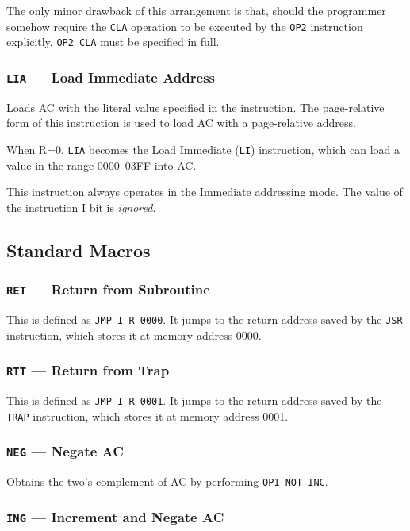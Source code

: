 \documentclass[11pt,a4paper,twocolumns]{article}
\newcommand\hex[1]{\textsf{#1}}
\newcommand\register[1]{\textsf{#1}}
\newcommand\A{\register{AC}}
\begin{document}
The only minor drawback of this arrangement is that, should the
programmer somehow require the {\tt CLA} operation to be executed by
the {\tt OP2} instruction explicitly, {\tt OP2 CLA} must be specified
in full.

\subsubsection{{\tt LIA} — Load Immediate Address}
\label{sec-lia}
\label{sec-li}

Loads \A{} with the literal value specified in the instruction. The
page-relative form of this instruction is used to load \A{} with a
page-relative address.

When R=0, {\tt LIA} becomes the Load Immediate ({\tt LI}) instruction,
which can load a value in the range \hex{0000}–\hex{03FF} into \A.

This instruction always operates in the Immediate addressing mode. The
value of the instruction I bit is {\em ignored}.

\subsection{Standard Macros}
\subsubsection{{\tt RET} — Return from Subroutine}

This is defined as {\tt JMP I R 0000}. It jumps to the return address
saved by the {\tt JSR} instruction, which stores it at memory address
\hex{0000}.

\subsubsection{{\tt RTT} — Return from Trap} 

This is defined as {\tt JMP I R 0001}. It jumps to the return address
saved by the {\tt TRAP} instruction, which stores it at memory address
\hex{0001}.

\subsubsection{{\tt NEG} — Negate \A}

Obtains the two's complement of \A{} by performing {\tt OP1 NOT INC}.

\subsubsection{{\tt ING} — Increment and Negate \A}
\end{document}
